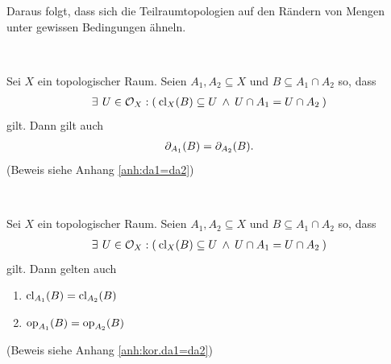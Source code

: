     Daraus folgt, dass sich die Teilraumtopologien auf den Rändern von Mengen unter gewissen Bedingungen ähneln.
    \begin{satz}\label{satz:da1=da2} \ \vspace{8pt}

        \noindent
        Sei $X$ ein topologischer Raum. Seien $A_1, A_2 \subseteq X$ und $B \subseteq A_1 \cap A_2$ so, dass
        \begin{align*}
            \exists\: \, U \in \mathcal{O}_X: (\: \text{cl}_X(B) \subseteq U \:\land\: U \cap A_1 = U \cap A_2 \:)
        \end{align*}
        gilt. Dann gilt auch  
        \begin{align*}
            \partial_{A_1}(B) = \partial_{A_2}(B).
        \end{align*}
        (Beweis siehe Anhang \ref{anh:da1=da2})
        
    \end{satz}

    \begin{kor}\label{kor:da1=da2} \ \vspace{8pt}

        \noindent
        Sei $X$ ein topologischer Raum. Seien $A_1, A_2 \subseteq X$ und $B \subseteq A_1 \cap A_2$ so, dass
        \begin{align*}
            \exists\: \, U \in \mathcal{O}_X: (\: \text{cl}_X(B) \subseteq U \:\land\: U \cap A_1 = U \cap A_2 \:)
        \end{align*}
        gilt. Dann gelten auch  
        \begin{enumerate}
            \item \label{kor:da1=da2.1} $\text{cl}_{A_1}(B) = \text{cl}_{A_2}(B)$
            \item \label{kor:da1=da2.2} $\text{op}_{A_1}(B) = \text{op}_{A_2}(B)$
        \end{enumerate} 
        (Beweis siehe Anhang \ref{anh:kor.da1=da2})
    \end{kor}
    
    
    
    
    
